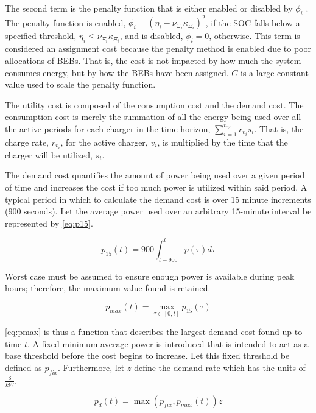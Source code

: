 \documentclass[11pt,a4paper,final]{article}
\begin{document}
The second term is the penalty function that is either enabled or disabled by \(\phi_i\)
\cite{luenberger-2008-penal-barrier-method}. The penalty function is enabled, \(\phi_i = (\eta_i - \nu_{\Xi_i} \kappa_{\Xi_i})^2\), if the
SOC falls below a specified threshold, \(\eta_i \le \nu_{\Xi_i} \kappa_{\Xi_i}\), and is disabled, \(\phi_i = 0\), otherwise. This term is
considered an assignment cost because the penalty method is enabled due to poor allocations of BEBs. That is, the cost
is not impacted by how much the system consumes energy, but by how the BEBs have been assigned. \(C\) is a large constant
value used to scale the penalty function.

The utility cost is composed of the consumption cost and the demand cost. The consumption cost is merely the summation
of all the energy being used over all the active periods for each charger in the time horizon, \(\sum_{i=1}^{n_V}
r_{v_i}s_i\). That is, the charge rate, \(r_{v_i}\), for the active charger, \(v_i\), is multiplied by the time that the
charger will be utilized, \(s_i\).

The demand cost quantifies the amount of power being used over a given period of time and increases the cost if too much
power is utilized within said period. A typical period in which to calculate the demand cost is over 15 minute
increments (900 seconds). Let the average power used over an arbitrary 15-minute interval be represented by \ref{eq:p15}.

\begin{equation}
\label{eq:p15}
p_{15}(t) = 900 \int_{t-900}^{t} p(\tau) d\tau
\end{equation}

Worst case must be assumed to ensure enough power is available during peak hours; therefore, the maximum value found is
retained.

\begin{equation}
\label{eq:pmax}
p_{max}(t) = \max\limits_{\tau \in [0,t]}p_{15}(\tau)
\end{equation}

\ref{eq:pmax} is thus a function that describes the largest demand cost found up to time \(t\). A fixed minimum average power is
introduced that is intended to act as a base threshold before the cost begins to increase. Let this fixed threshold be
defined as \(p_{fix}\). Furthermore, let \(z\) define the demand rate which has the units of \(\frac{\$}{kW}\).

\begin{equation}
\label{eq:pdem}
p_d(t) = \max(p_{fix},p_{max}(t))z
\end{equation}
\end{document}
